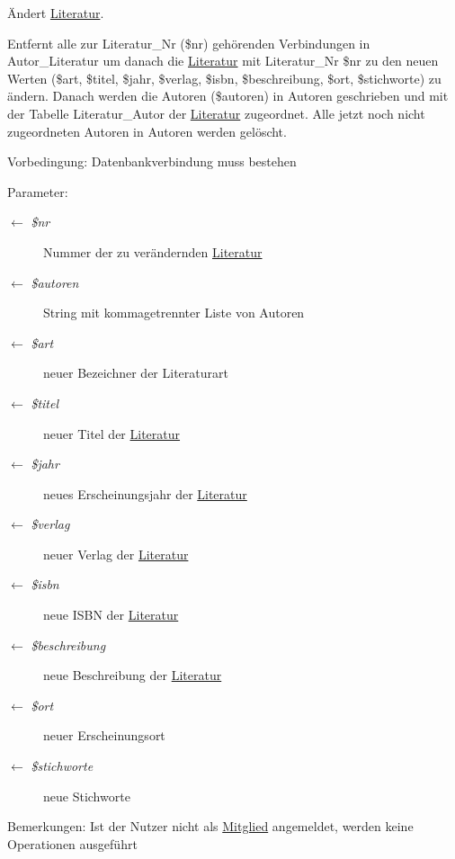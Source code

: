 Ändert \hyperlink{classLiteratur}{Literatur}. 

Entfernt alle zur Literatur\_\-Nr (\$nr) gehörenden Verbindungen in Autor\_\-Literatur um danach die \hyperlink{classLiteratur}{Literatur} mit Literatur\_\-Nr \$nr zu den neuen Werten (\$art, \$titel, \$jahr, \$verlag, \$isbn, \$beschreibung, \$ort, \$stichworte) zu ändern. Danach werden die Autoren (\$autoren) in Autoren geschrieben und mit der Tabelle Literatur\_\-Autor der \hyperlink{classLiteratur}{Literatur} zugeordnet. Alle jetzt noch nicht zugeordneten Autoren in Autoren werden gelöscht. \begin{Desc}
\item[Vorbedingung:]Datenbankverbindung muss bestehen \end{Desc}
\begin{Desc}
\item[Parameter:]
\begin{description}
\item[\mbox{$\leftarrow$} {\em \$nr}]Nummer der zu verändernden \hyperlink{classLiteratur}{Literatur} \item[\mbox{$\leftarrow$} {\em \$autoren}]String mit kommagetrennter Liste von Autoren \item[\mbox{$\leftarrow$} {\em \$art}]neuer Bezeichner der Literaturart \item[\mbox{$\leftarrow$} {\em \$titel}]neuer Titel der \hyperlink{classLiteratur}{Literatur} \item[\mbox{$\leftarrow$} {\em \$jahr}]neues Erscheinungsjahr der \hyperlink{classLiteratur}{Literatur} \item[\mbox{$\leftarrow$} {\em \$verlag}]neuer Verlag der \hyperlink{classLiteratur}{Literatur} \item[\mbox{$\leftarrow$} {\em \$isbn}]neue ISBN der \hyperlink{classLiteratur}{Literatur} \item[\mbox{$\leftarrow$} {\em \$beschreibung}]neue Beschreibung der \hyperlink{classLiteratur}{Literatur} \item[\mbox{$\leftarrow$} {\em \$ort}]neuer Erscheinungsort \item[\mbox{$\leftarrow$} {\em \$stichworte}]neue Stichworte \end{description}
\end{Desc}
\begin{Desc}
\item[Bemerkungen:]Ist der Nutzer nicht als \hyperlink{classMitglied}{Mitglied} angemeldet, werden keine Operationen ausgeführt \end{Desc}


